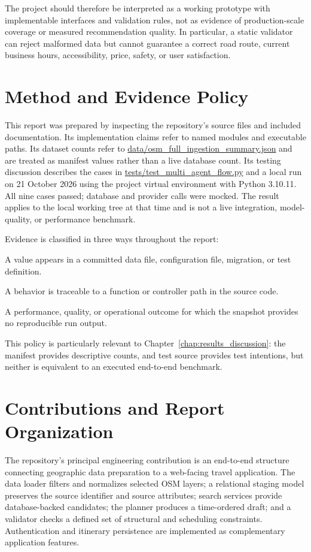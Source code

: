 The project should therefore be interpreted as a working prototype with implementable interfaces and validation rules, not as evidence of production-scale coverage or measured recommendation quality. In particular, a static validator can reject malformed data but cannot guarantee a correct road route, current business hours, accessibility, price, safety, or user satisfaction.

\section{Method and Evidence Policy}

This report was prepared by inspecting the repository's source files and included documentation. Its implementation claims refer to named modules and executable paths. Its dataset counts refer to \url{data/osm_full_ingestion_summary.json} and are treated as manifest values rather than a live database count. Its testing discussion describes the cases in \url{tests/test_multi_agent_flow.py} and a local run on 21 October 2026 using the project virtual environment with Python 3.10.11. All nine cases passed; database and provider calls were mocked. The result applies to the local working tree at that time and is not a live integration, model-quality, or performance benchmark.

Evidence is classified in three ways throughout the report:
\begin{description}[leftmargin=2.1cm,style=standard,itemsep=1pt,parsep=0pt]
    \item[Recorded] A value appears in a committed data file, configuration file, migration, or test definition.
    \item[Implemented] A behavior is traceable to a function or controller path in the source code.
    \item[Unmeasured] A performance, quality, or operational outcome for which the snapshot provides no reproducible run output.
\end{description}
This policy is particularly relevant to Chapter~\ref{chap:results_discussion}: the manifest provides descriptive counts, and test source provides test intentions, but neither is equivalent to an executed end-to-end benchmark.

\section{Contributions and Report Organization}

The repository's principal engineering contribution is an end-to-end structure connecting geographic data preparation to a web-facing travel application. The data loader filters and normalizes selected OSM layers; a relational staging model preserves the source identifier and source attributes; search services provide database-backed candidates; the planner produces a time-ordered draft; and a validator checks a defined set of structural and scheduling constraints. Authentication and itinerary persistence are implemented as complementary application features.

